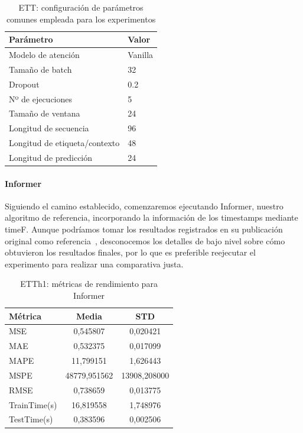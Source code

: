 \begin{table}[!ht]
	\centering
	\begin{tabular}{l|l}
		\toprule
		Parámetro & Valor \\
		\midrule
		{Modelo de atención} & Vanilla \\
		{Tamaño de batch} & 32 \\
		{Dropout} & 0.2 \\
		{Nº de ejecuciones} & 5 \\
		{Tamaño de ventana} & 24 \\
		{Longitud de secuencia} & 96 \\
		{Longitud de etiqueta/contexto} & 48 \\
		{Longitud de predicción} & 24 \\
		\bottomrule
	\end{tabular}
	\caption{ETT: configuración de parámetros comunes empleada para los experimentos}
	\label{ajustesett}
\end{table}

\paragraph{Informer}

Siguiendo el camino establecido, comenzaremos ejecutando Informer, nuestro algoritmo de referencia, incorporando la información de los timestamps mediante timeF. Aunque podríamos tomar los resultados registrados en su publicación original como referencia~\cite{zhou2021informerefficienttransformerlong}, desconocemos los detalles de bajo nivel sobre cómo obtuvieron los resultados finales, por lo que es preferible reejecutar el experimento para realizar una comparativa justa.

\begin{table}[!ht]
	\centering
	\begin{tabular}{l|c|c}
		\toprule
		Métrica & Media & STD \\
		\midrule
		MSE & 0,545807 & 0,020421 \\
		MAE & 0,532375 & 0,017099 \\
		MAPE & 11,799151 & 1,626443 \\
		MSPE & 48779,951562 & 13908,208000 \\
		RMSE & 0,738659 & 0,013775 \\
		TrainTime(s) & 16,819558 & 1,748976 \\
		TestTime(s) & 0,383596 & 0,002506 \\
		\bottomrule
	\end{tabular}
	\caption{ETTh1: métricas de rendimiento para Informer}
	\label{etth1informer}
\end{table}


